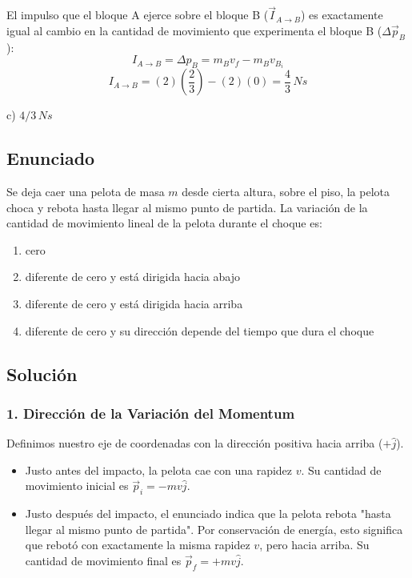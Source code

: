 \documentclass[12pt, a4paper]{article}
\begin{document}
El impulso que el bloque A ejerce sobre el bloque B ($\vec{I}_{A \to B}$) es exactamente igual al cambio en la cantidad de movimiento que experimenta el bloque B ($\Delta\vec{p}_B$):
$$ I_{A \to B} = \Delta p_B = m_B v_f - m_B v_{B_i} $$
$$ I_{A \to B} = (2)\left(\frac{2}{3}\right) - (2)(0) = \frac{4}{3}\,\si{Ns} $$

\begin{tcolorbox}[colback=green!5!white, colframe=green!50!black, title=Respuesta Final]
\centering \Large c) $4/3\,\si{Ns}$
\end{tcolorbox}

\newpage

\subsection*{Enunciado}
Se deja caer una pelota de masa $m$ desde cierta altura, sobre el piso, la pelota choca y rebota hasta llegar al mismo punto de partida. La variación de la cantidad de movimiento lineal de la pelota durante el choque es:
\begin{enumerate}[label=\alph*)]
    \item cero
    \item diferente de cero y está dirigida hacia abajo
    \item diferente de cero y está dirigida hacia arriba
    \item diferente de cero y su dirección depende del tiempo que dura el choque
\end{enumerate}

\subsection*{Solución}

\subsubsection*{1. Dirección de la Variación del Momentum}
Definimos nuestro eje de coordenadas con la dirección positiva hacia arriba ($+\hat{j}$).
\begin{itemize}
    \item Justo antes del impacto, la pelota cae con una rapidez $v$. Su cantidad de movimiento inicial es $\vec{p}_i = -mv\hat{j}$.
    \item Justo después del impacto, el enunciado indica que la pelota rebota "hasta llegar al mismo punto de partida". Por conservación de energía, esto significa que rebotó con exactamente la misma rapidez $v$, pero hacia arriba. Su cantidad de movimiento final es $\vec{p}_f = +mv\hat{j}$.
\end{itemize}
\end{document}
